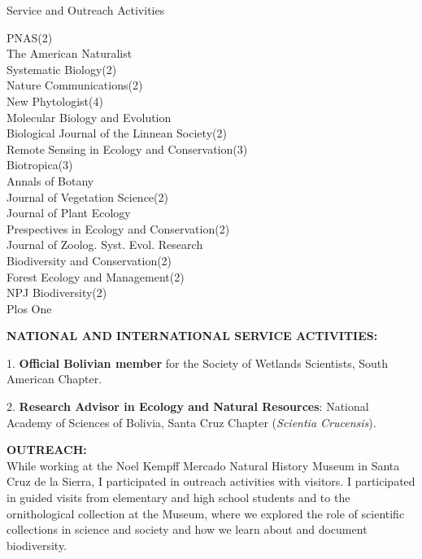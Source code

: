 \documentclass{resume} %
\begin{document}
\begin{rSection}{Service and Outreach Activities}
\begin{multicols}{2}
\columnbreak

PNAS(2) \\
The American Naturalist \\ 
Systematic Biology(2) \\
Nature Communications(2) \\
New Phytologist(4) \\ 
Molecular Biology and Evolution \\ 
Biological Journal of the Linnean Society(2) \\
Remote Sensing in Ecology and Conservation(3) \\ 
Biotropica(3) \\ 
Annals of Botany \\ 
Journal of Vegetation Science(2) \\ 
Journal of Plant Ecology \\ 
Prespectives in Ecology and Conservation(2) \\
Journal of Zoolog. Syst. Evol. Research \\
Biodiversity and Conservation(2) \\
Forest Ecology and Management(2) \\ 
NPJ Biodiversity(2) \\
Plos One \smallskip

\end{multicols}

\textbf{NATIONAL AND INTERNATIONAL SERVICE ACTIVITIES:} \smallskip 

\item 1. \textbf{Official Bolivian member} for the Society of Wetlands Scientists, South American Chapter. 

\item 2. \textbf{Research Advisor in Ecology and Natural Resources}: National Academy of Sciences of Bolivia, Santa Cruz Chapter ({\em Scientia Crucensis}). 

\textbf{OUTREACH:} \smallskip \\ 
While working at the Noel Kempff Mercado Natural History Museum in Santa Cruz de la Sierra, I participated in outreach activities with visitors. I participated in guided visits from elementary and high school students and to the ornithological collection at the Museum, where we explored the role of scientific collections in science and society and how we learn about and document biodiversity.


\end{rSection}
\end{document}
